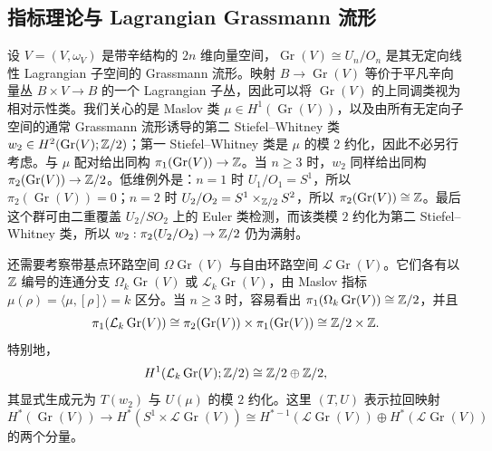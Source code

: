 \subsection{指标理论与 Lagrangian Grassmann 流形}\label{sec:11e}
设 $V=(V,\allowbreak \omega_V)$ 是带辛结构的 $2n$ 维向量空间，$\operatorname{Gr}(V)\cong U_n/O_n$ 是其无定向线性 Lagrangian 子空间的 Grassmann 流形。映射 $B\to\operatorname{Gr}(V)$ 等价于平凡辛向量丛 $B\times V\to B$ 的一个 Lagrangian 子丛，因此可以将 $\operatorname{Gr}(V)$ 的上同调类视为相对示性类。我们关心的是 Maslov 类 $\mu\in H^1(\operatorname{Gr}(V))$，以及由所有无定向子空间的通常 Grassmann 流形诱导的第二 Stiefel–Whitney 类 $w_2\in H^2(\operatorname{Gr}(V);\mathbb Z/2)$；第一 Stiefel–Whitney 类是 $\mu$ 的模 $2$ 约化，因此不必另行考虑。与 $\mu$ 配对给出同构 $\pi_1(\operatorname{Gr}(V))\to\mathbb Z$。当 $n\geq3$ 时，$w_2$ 同样给出同构 $\pi_2(\operatorname{Gr}(V))\to\mathbb Z/2$。低维例外是：$n=1$ 时 $U_1/O_1=S^1$，所以 $\pi_2(\operatorname{Gr}(V))=0$；$n=2$ 时 $U_2/O_2=S^1\times_{\mathbb Z/2}S^2$，所以 $\pi_2(\operatorname{Gr}(V))\cong\mathbb Z$。最后这个群可由二重覆盖 $U_2/SO_2$ 上的 Euler 类检测，而该类模 $2$ 约化为第二 Stiefel–Whitney 类，所以 $w_2:\pi_2(U_2/O_2)\to\mathbb Z/2$ 仍为满射。

还需要考察带基点环路空间 $\Omega\operatorname{Gr}(V)$ 与自由环路空间 $\mathcal L\operatorname{Gr}(V)$。它们各有以 $\mathbb Z$ 编号的连通分支 $\Omega_k\operatorname{Gr}(V)$ 或 $\mathcal L_k\operatorname{Gr}(V)$，由 Maslov 指标 $\mu(\rho)=\langle\mu,\allowbreak [\rho]\rangle=k$ 区分。当 $n\geq3$ 时，容易看出 $\pi_1(\Omega_k\operatorname{Gr}(V))\cong\mathbb Z/2$，并且
\[
\pi_1(\mathcal L_k\operatorname{Gr}(V))\cong\pi_2(\operatorname{Gr}(V))\times\pi_1(\operatorname{Gr}(V))\cong\mathbb Z/2\times\mathbb Z.
\]
特别地，
\begin{equation}\label{eq:11.15}
H^1(\mathcal L_k\operatorname{Gr}(V);\mathbb Z/2)\cong\mathbb Z/2\oplus\mathbb Z/2,
\end{equation}
其显式生成元为 $T(w_2)$ 与 $U(\mu)$ 的模 $2$ 约化。这里 $(T,\allowbreak U)$ 表示拉回映射
\[
H^*(\operatorname{Gr}(V))\longrightarrow H^*(S^1\times\mathcal L\operatorname{Gr}(V))
\cong H^{*-1}(\mathcal L\operatorname{Gr}(V))\oplus H^*(\mathcal L\operatorname{Gr}(V))
\]
的两个分量。

